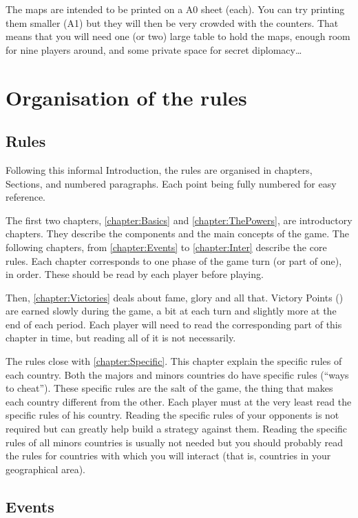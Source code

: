The maps are intended to be printed on a A0 sheet (each). You can try printing
them smaller (A1) but they will then be very crowded with the counters. That
means that you will need one (or two) large table to hold the maps, enough
room for nine players around, and some private space for secret
diplomacy\ldots

\section*{Organisation of the rules}
\subsection*{Rules}

Following this informal Introduction, the rules are organised in chapters,
Sections, and numbered paragraphs. Each point being fully numbered for easy
reference.

The first two chapters, \ref{chapter:Basics} and \ref{chapter:ThePowers}, are
introductory chapters. They describe the components and the main concepts of
the game. The following chapters, from \ref{chapter:Events} to
\ref{chapter:Inter} describe the core rules. Each chapter corresponds to one
phase of the game turn (or part of one), in order. These should be read by
each player before playing.

Then, \ref{chapter:Victories} deals about fame, glory and all that. Victory
Points (\VPs) are earned slowly during the game, a bit at each turn and
slightly more at the end of each period. Each player will need to read the
corresponding part of this chapter in time, but reading all of it is not
necessarily.

The rules close with \ref{chapter:Specific}. This chapter explain the specific
rules of each country. Both the majors and minors countries do have specific
rules (``ways to cheat''). These specific rules are the salt of the game, the
thing that makes each country different from the other. Each player must at
the very least read the specific rules of his country. Reading the specific
rules of your opponents is not required but can greatly help build a strategy
against them. Reading the specific rules of all minors countries is usually
not needed but you should probably read the rules for countries with which you
will interact (that is, countries in your geographical area).

\subsection*{Events}
